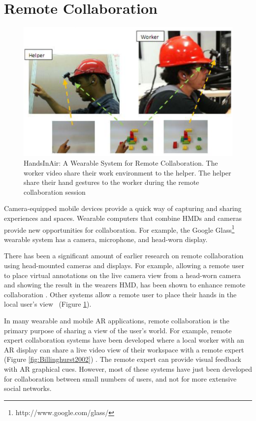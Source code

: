 \section{Remote Collaboration}

\begin{figure}
    \centering
    \includegraphics[width=\linewidth]{images/20-background/huang2013.eps}
    \caption{HandsInAir: A Wearable System for Remote Collaboration. The worker video share their work environment to the helper. The helper share their hand gestures to the worker during the remote collaboration session \cite{Huang2013}}
    \label{fig:HandsInAir}
\end{figure}

Camera-equipped mobile devices provide a quick way of capturing and sharing experiences and spaces. Wearable computers that combine HMDs and cameras provide new opportunities for collaboration. For example, the Google Glass\footnote{http://www.google.com/glass/} wearable system has a camera, microphone, and head-worn display.

There has been a significant amount of earlier research on remote collaboration using head-mounted cameras and displays. For example, allowing a remote user to place virtual annotations on the live camera view from a head-worn camera and showing the result in the wearers HMD, has been shown to enhance remote collaboration \cite{Fussell2003}. Other systems allow a remote user to place their hands in the local user's view~\cite{Huang2013} (Figure \ref{fig:HandsInAir}). 

In many wearable and mobile AR applications, remote collaboration is the primary purpose of sharing a view of the user's world. For example, remote expert collaboration systems have been developed where a local worker with an AR display can share a live video view of their workspace with a remote expert (Figure \ref{fig:Billinghurst2002}) \cite{Billinghurst2002}. The remote expert can provide visual feedback with AR graphical cues.  However, most of these systems have just been developed for collaboration between small numbers of users, and not for more extensive social networks. 

